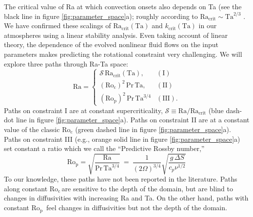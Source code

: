 \documentclass[twocolumn, amsmath, amsfonts, amssymb]{aastex62}
\newcommand{\pro}{\ensuremath{\text{Ro}_{\text{p}}}}
\newcommand{\con}{\ensuremath{\text{Ro}_{\text{c}}}}
\begin{document}
The critical value of Ra at which convection onsets also depends on Ta (see the black line in figure \ref{fig:parameter_space}a);  
roughly according to $\text{Ra}_{\text{crit}} \sim \text{Ta}^{2/3}$ \citep{Chandrasekhar,calkins&all2015a}.
We have confirmed these scalings of $\text{Ra}_{\text{crit}}(\text{Ta})$ and 
$k_{\text{crit}}(\text{Ta})$ in our atmospheres using a linear
stability analysis.
Even taking account of linear theory, the dependence of the evolved nonlinear fluid 
flows on the input parameters makes predicting the rotational constraint very challenging. 
We will explore three paths through Ra-Ta space:
\begin{equation}
    \text{Ra} = 
    \begin{cases}
    \mathcal{S}\,\text{Ra}_\text{crit}(\text{Ta}), & (\text{I})\\
    (\con)^2 \, \text{Pr}\, \text{Ta}, & (\text{II}) \\
    (\pro)^2\, \text{Pr}\, \text{Ta}^{3/4} & (\text{III}).
    \end{cases}
    \label{eqn:paths}
\end{equation}
Paths on constraint I are at constant supercriticality, 
$\mathcal{S} \equiv \text{Ra}/\text{Ra}_{\text{crit}}$
(blue dash-dot line in figure \ref{fig:parameter_space}a).
Paths on constraint II are at a constant value of the classic $\con$ (green dashed line in figure \ref{fig:parameter_space}a). Paths on constraint
III (e.g., orange solid line in figure \ref{fig:parameter_space}a) 
set constant a ratio which we call the ``Predictive Rossby number,'' 
\begin{equation}
\pro = \sqrt{\frac{\text{Ra}}{\text{Pr}\,\text{Ta}^{3/4}}} \ = \    
\frac{1}{(2 \Omega)^{3/4}} \sqrt{\frac{g \, \Delta  S}{c_{p} \nu^{1/2}}}
\end{equation}
To our knowledge, these paths have not been reported in the literature. 
Paths along constant \con$\,$are sensitive to the depth of the domain, 
but are blind to changes in diffusivities with increasing Ra and Ta. 
On the other hand, paths with constant \pro$\,$ 
feel changes in diffusivities but not the depth of the domain.

\end{document}
